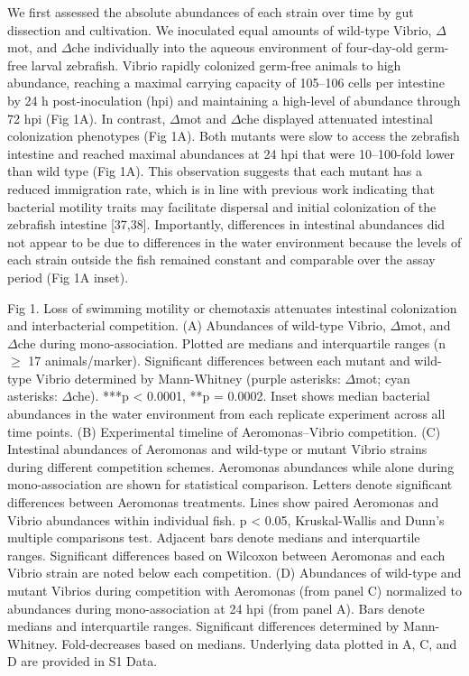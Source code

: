 We first assessed the absolute abundances of each strain over time by gut dissection and cultivation. We inoculated equal amounts of wild-type Vibrio, $\Delta$mot, and $\Delta$che individually into the aqueous environment of four-day-old germ-free larval zebrafish. Vibrio rapidly colonized germ-free animals to high abundance, reaching a maximal carrying capacity of 105–106 cells per intestine by 24 h post-inoculation (hpi) and maintaining a high-level of abundance through 72 hpi (Fig 1A). In contrast, $\Delta$mot and $\Delta$che displayed attenuated intestinal colonization phenotypes (Fig 1A). Both mutants were slow to access the zebrafish intestine and reached maximal abundances at 24 hpi that were 10–100-fold lower than wild type (Fig 1A). This observation suggests that each mutant has a reduced immigration rate, which is in line with previous work indicating that bacterial motility traits may facilitate dispersal and initial colonization of the zebrafish intestine [37,38]. Importantly, differences in intestinal abundances did not appear to be due to differences in the water environment because the levels of each strain outside the fish remained constant and comparable over the assay period (Fig 1A inset).

Fig 1. Loss of swimming motility or chemotaxis attenuates intestinal colonization and interbacterial competition.
(A) Abundances of wild-type Vibrio, $\Delta$mot, and $\Delta$che during mono-association. Plotted are medians and interquartile ranges (n $\ge$ 17 animals/marker). Significant differences between each mutant and wild-type Vibrio determined by Mann-Whitney (purple asterisks: $\Delta$mot; cyan asterisks: $\Delta$che). ***p < 0.0001, **p = 0.0002. Inset shows median bacterial abundances in the water environment from each replicate experiment across all time points. (B) Experimental timeline of Aeromonas–Vibrio competition. (C) Intestinal abundances of Aeromonas and wild-type or mutant Vibrio strains during different competition schemes. Aeromonas abundances while alone during mono-association are shown for statistical comparison. Letters denote significant differences between Aeromonas treatments. Lines show paired Aeromonas and Vibrio abundances within individual fish. p < 0.05, Kruskal-Wallis and Dunn's multiple comparisons test. Adjacent bars denote medians and interquartile ranges. Significant differences based on Wilcoxon between Aeromonas and each Vibrio strain are noted below each competition. (D) Abundances of wild-type and mutant Vibrios during competition with Aeromonas (from panel C) normalized to abundances during mono-association at 24 hpi (from panel A). Bars denote medians and interquartile ranges. Significant differences determined by Mann-Whitney. Fold-decreases based on medians. Underlying data plotted in A, C, and D are provided in S1 Data. 


